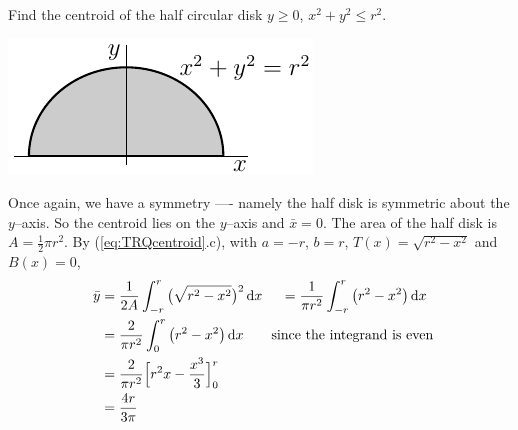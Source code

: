 \goodbreak
\begin{eg}\label{eg:TRQcentroidBaa}
  Find the centroid of the half circular disk $y\ge 0$, $x^2+y^2\le r^2$.

\begin{efig}
\begin{center}
    \includegraphics{centroidHalfCircle.pdf}
\end{center}
\end{efig}

\soln  Once again, we have a symmetry ---- namely the half disk is symmetric about the $y$--axis. So the centroid lies on the $y$--axis and $\bar x=0$.
The area of the half disk is $A=\frac{1}{2}\pi r^2$.
By (\ref{eq:TRQcentroid}.c), with $a=-r$, $b=r$, $T(x)=\sqrt{r^2-x^2}$ and $B(x)=0$,
\begin{alignat*}{3}
\bar y & =  \frac{1}{2A}\int_{-r}^r \big(\sqrt{r^2-x^2}\big)^2\,\dee{x}\
 &&=  \frac{1}{\pi r^2}\int_{-r}^r \big(r^2-x^2\big)\,\dee{x} \\
 &=  \frac{2}{\pi r^2}\int_0^r \big(r^2-x^2\big)\,\dee{x}
\qquad\text{since the integrand is even}\hidewidth\\
 &=  \frac{2}{\pi r^2}\Big[r^2x-\frac{x^3}{3}\Big]_0^r  \\
 &=\frac{4r}{3\pi}
\end{alignat*}
\end{eg}


